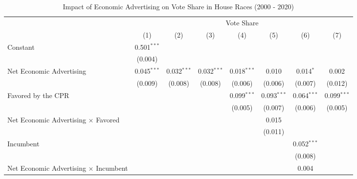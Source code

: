 
\begin{table}[htbp]
   \caption{Impact of Economic Advertising on Vote Share in House Races (2000 - 2020)}
   \bigskip
   \centering
   \small
   \begin{tabular}{lccccccc}
      \toprule
       & \multicolumn{7}{c}{Vote Share}\\
                                                    & (1)           & (2)           & (3)           & (4)           & (5)           & (6)           & (7)\\  
      \midrule 
      Constant                                      & 0.501$^{***}$ &               &               &               &               &               &   \\   
                                                    & (0.004)       &               &               &               &               &               &   \\   
      Net Economic Advertising                      & 0.045$^{***}$ & 0.032$^{***}$ & 0.032$^{***}$ & 0.018$^{***}$ & 0.010         & 0.014$^{*}$   & 0.002\\   
                                                    & (0.009)       & (0.008)       & (0.008)       & (0.006)       & (0.006)       & (0.007)       & (0.012)\\   
      Favored by the CPR                            &               &               &               & 0.099$^{***}$ & 0.093$^{***}$ & 0.064$^{***}$ & 0.099$^{***}$\\   
                                                    &               &               &               & (0.005)       & (0.007)       & (0.006)       & (0.005)\\   
      Net Economic Advertising × Favored            &               &               &               &               & 0.015         &               &   \\   
                                                    &               &               &               &               & (0.011)       &               &   \\   
      Incumbent                                     &               &               &               &               &               & 0.052$^{***}$ &   \\   
                                                    &               &               &               &               &               & (0.008)       &   \\   
      Net Economic Advertising × Incumbent          &               &               &               &               &               & 0.004         &   \\   

\end{tabular}
\end{table}
